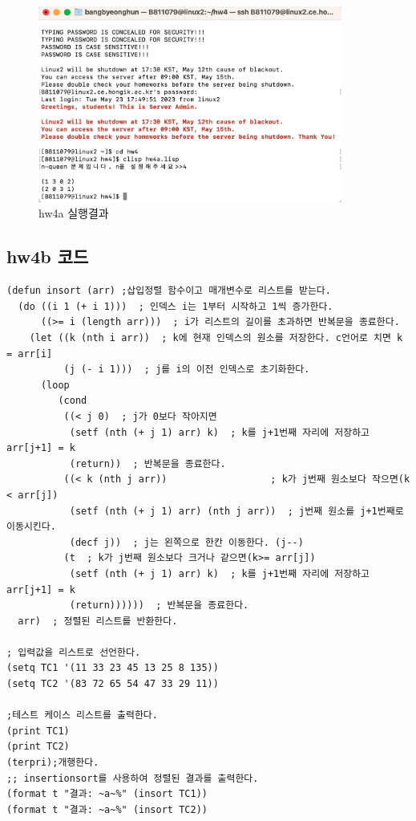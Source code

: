 \documentclass{article}
\begin{document}
\begin{figure}[h]
    \centering
    \includegraphics[width = 10cm]{hw4a_run.png}
    \caption{hw4a 실행결과}
    \label{fig:fig3}
\end{figure}
\newpage
\subsection{hw4b 코드}
\begin{verbatim}
(defun insort (arr) ;삽입정렬 함수이고 매개변수로 리스트를 받는다.
  (do ((i 1 (+ i 1)))  ; 인덱스 i는 1부터 시작하고 1씩 증가한다.
      ((>= i (length arr)))  ; i가 리스트의 길이를 초과하면 반복문을 종료한다.
    (let ((k (nth i arr))  ; k에 현재 인덱스의 원소를 저장한다. c언어로 치면 k = arr[i]
          (j (- i 1)))  ; j를 i의 이전 인덱스로 초기화한다.
      (loop
         (cond
          ((< j 0)  ; j가 0보다 작아지면 
           (setf (nth (+ j 1) arr) k)  ; k를 j+1번째 자리에 저장하고 arr[j+1] = k
           (return))  ; 반복문을 종료한다.
          ((< k (nth j arr))                  ; k가 j번째 원소보다 작으면(k < arr[j])
           (setf (nth (+ j 1) arr) (nth j arr))  ; j번째 원소를 j+1번째로 이동시킨다.
           (decf j))  ; j는 왼쪽으로 한칸 이동한다. (j--)
          (t  ; k가 j번째 원소보다 크거나 같으면(k>= arr[j])
           (setf (nth (+ j 1) arr) k)  ; k를 j+1번째 자리에 저장하고  arr[j+1] = k
           (return))))))  ; 반복문을 종료한다.
  arr)  ; 정렬된 리스트를 반환한다.

; 입력값을 리스트로 선언한다.
(setq TC1 '(11 33 23 45 13 25 8 135))
(setq TC2 '(83 72 65 54 47 33 29 11))

;테스트 케이스 리스트를 출력한다.
(print TC1)
(print TC2)
(terpri);개행한다.
;; insertionsort를 사용하여 정렬된 결과를 출력한다.
(format t "결과: ~a~%" (insort TC1))
(format t "결과: ~a~%" (insort TC2))
\end{verbatim}
\end{document}
